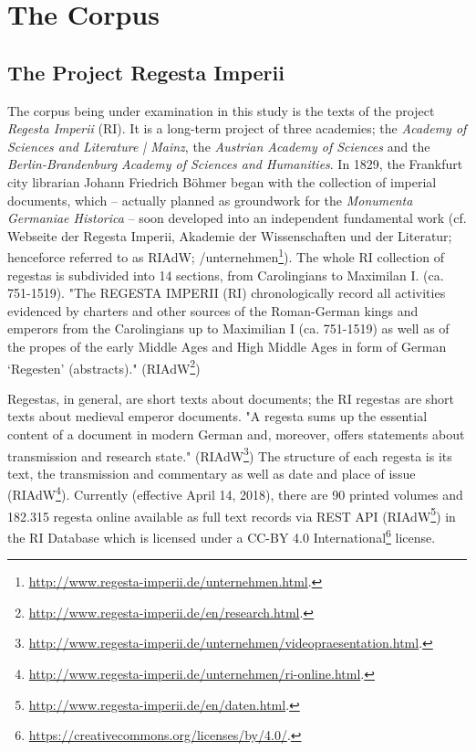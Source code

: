\documentclass[11pt,a4paper]{article}
\begin{document}
\section{The Corpus}
\label{cha:corpus}
\subsection{The Project Regesta Imperii}
The corpus being under examination in this study is the texts of the project \textit{Regesta Imperii} (RI). It is a long-term project of three academies; the \textit{Academy of Sciences and Literature | Mainz}, the \textit{Austrian Academy of Sciences} and the \textit{Berlin-Brandenburg Academy of Sciences and Humanities}. In 1829, the Frankfurt city librarian Johann Friedrich B{\"o}hmer began with the collection of imperial documents, which – actually planned as groundwork for the \textit{Monumenta Germaniae Historica} – soon developed into an independent fundamental work (cf. Webseite der Regesta Imperii, Akademie der Wissenschaften und der Literatur; henceforce referred to as RIAdW; /unternehmen\footnote{\url{http://www.regesta-imperii.de/unternehmen.html}.}). The whole RI collection of regestas is subdivided into 14 sections, from Carolingians to Maximilan I. (ca. 751-1519). "The REGESTA IMPERII (RI) chronologically record all activities evidenced by charters and other sources of the Roman-German kings and emperors from the Carolingians up to Maximilian I (ca. 751-1519) as well as of the propes of the early Middle Ages and High Middle Ages in form of German ‘Regesten’ (abstracts)." (RIAdW\footnote{\url{http://www.regesta-imperii.de/en/research.html}.})

Regestas, in general, are short texts about documents; the RI regestas are short texts about medieval emperor documents. "A regesta sums up the essential content of a document in modern German and, moreover, offers statements about transmission and research state." (RIAdW\footnote{\url{http://www.regesta-imperii.de/unternehmen/videopraesentation.html}.}) The structure of each regesta is its text, the transmission and commentary as well as date and place of issue (RIAdW\footnote{\url{http://www.regesta-imperii.de/unternehmen/ri-online.html}.}). Currently (effective April 14, 2018), there are 90 printed volumes and 182.315 regesta online available as full text records via REST API (RIAdW\footnote{\url{http://www.regesta-imperii.de/en/daten.html}.}) in the RI Database which is licensed under a CC-BY 4.0 International\footnote{\url{https://creativecommons.org/licenses/by/4.0/}.} license.
\end{document}
